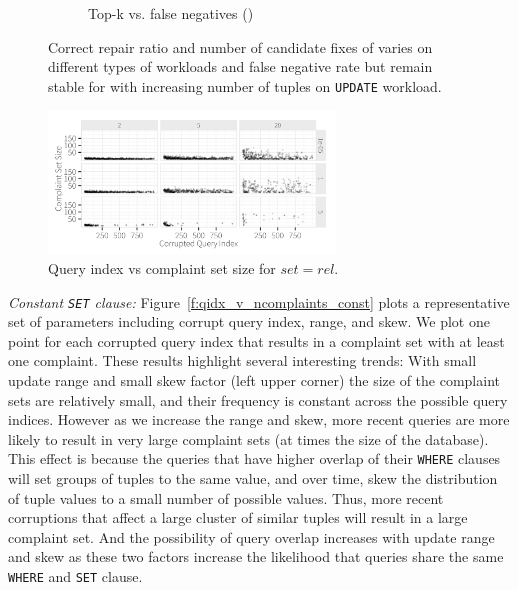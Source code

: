 \begin{figure}[ht]
\begin{subfigure} [t]{.3\textwidth}
    \vspace*{-.25in}
    \caption{Top-k vs. false negatives (\color{red}{not complete!})}
    \vspace*{-.1in}
    \label{f:fnfixcount} 
    \end{subfigure}
   \caption{Correct repair ratio and number of candidate fixes of \sys varies on different types of workloads and false negative rate but remain 
   stable for with increasing number of tuples on \texttt{UPDATE} workload.}
   \vspace*{-.1in}
   \label{fig:truerate}
  \end{figure}



\begin{figure}[h]
\centering
\includegraphics[width = 3in]{figures/qidxsimulation/qidx_v_ncomplaints_20attrs_rel}
\caption{Query index vs complaint set size for $set = rel$.}
\label{f:qidx_v_ncomplaints_rel} 
\end{figure}


\smallskip
\emph{Constant \texttt{SET} clause: } Figure~\ref{f:qidx_v_ncomplaints_const} plots a representative set of parameters including corrupt query index, range, and skew. We plot one point
for each corrupted query index that results in a complaint set with at least one complaint. 
These results highlight several interesting trends:  With small update range and small skew factor (left upper corner)
the size of the complaint sets are relatively small, and their frequency is constant across the possible query indices.
However as we increase the range and skew, more recent queries are more likely to result in very large complaint sets (at times the size of the database).   
This effect is because the queries that have higher overlap of their \texttt{WHERE} clauses will set groups of tuples to the same value,
and over time, skew the distribution of tuple values to a small number of possible values. 
Thus, more recent corruptions that affect a large cluster of similar tuples will result in a large complaint set.
And the possibility of query overlap increases with update range and skew as these two factors increase the likelihood that queries share the same \texttt{WHERE} and \texttt{SET} clause. 


